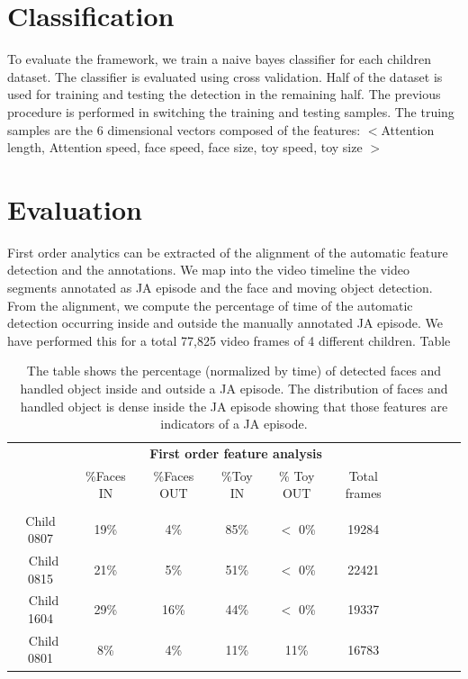 \documentclass[10pt,letterpaper]{article}
\begin{document}
\section{Classification}
To evaluate the framework, we train a naive bayes classifier for each children dataset. The classifier is evaluated using cross validation. Half of the dataset is used for training and testing the detection in the remaining half. The previous procedure is performed in switching the training and testing samples. The truing samples are the 6 dimensional vectors composed of the features: $<$Attention length, Attention speed,  face speed, face size, toy speed, toy size $>$
\section{Evaluation}

First order analytics can be extracted of the alignment of the automatic feature detection and the annotations. We map into the video timeline the video segments annotated as JA episode and the face and moving object detection. From the alignment, we compute the percentage of time of the automatic detection occurring inside and outside the manually annotated JA episode. We have performed this for a total 77,825 video frames of 4 different children.  Table 

\begin{table}
\centering
\begin{tabular}{|c|c|c|c|c|c|c|c|c|c|c|}
\cline{2-6}
\multicolumn{1}{c}{} & \multicolumn{5}{c}{{\bf First order feature analysis}} 
\\
\cline{2-6}
\multicolumn{1}{c|}{} &\%Faces IN & \%Faces OUT & \%Toy IN & \% Toy OUT & Total frames\\
\hline\\[-1.2em]\hline
Child 0807 &  19\%        & 4\%    &  85\%  &  $<$ 0\%& 19284\\
\hline\
Child 0815 &   21\%       & 5\%    &  51\%   &$<$ 0\%& 22421\\
\hline\
Child 1604 &   29\%       & 16\%  &  44\%   & $<$ 0\%  & 19337\\
\hline\
Child 0801 &   8\%         &  4\%   &  11\%   & 11\%  & 16783\\
\hline
\end{tabular}
\caption{The table shows the percentage (normalized by time) of detected faces and handled object inside and outside a JA episode. The distribution of faces and handled object is dense inside the JA episode showing that those features are indicators of a JA episode.}
\label{tb:Results2}
\end{table}
\end{document}
